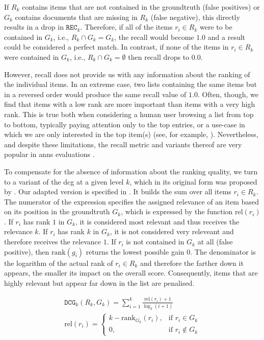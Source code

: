 If $R_k$ contains items that are not contained in the groundtruth (false positives) or $G_k$ contains documents that are missing in $R_k$ (false negative), this directly results in a drop in $\texttt{REC}_k$. Therefore, if all of the items $r_i \in R_k$ were to be contained in $G_k$, i.e., $R_k \cap G_k = G_k$, the recall would become $1.0$ and a result could be considered a perfect match. In contrast, if none of the items in $r_i \in R_k$ were contained in $G_k$, i.e., $R_k \cap G_k = \emptyset$ then recall drops to $0.0$. 

However, recall does not provide us with any information about the ranking of the individual items. In an extreme case, two lists containing the same items but in a reversed order would produce the same recall value of $1.0$. Often, though, we find that items with a low rank are more important than items with a very high rank. This is true both when considering a human user browsing a list from top to bottom, typically paying attention only to the top entries, or a use-case in which we are only interested in the top item(s) (see, for example, ). Nevertheless, and despite these limitations, the recall metric and variants thereof are very popular in \acrshort{anns} evaluations \cite{Aumueller:2017ANN,Simhadri:2022Results}. 

To compensate for the absence of information about the ranking quality, we turn to a variant of the \acrshort{dcg} at a given level $k$, which in its original form was proposed by \cite{Jarvelin:2002Cumulated}. Our adapted version is specified in . It builds the sum over all items $r_i \in R_k$. The numerator of the expression specifies the assigned relevance of an item based on its position in the groundtruth $G_k$, which is expressed by the function $\text{rel} (r_i)$. If $r_i$ has rank $1$ in $G_k$, it is considered most relevant and thus receives the relevance $k$. If $r_i$ has rank $k$ in $G_k$, it is not considered very releveant and therefore receives the relevance $1$. If $r_i$ is not contained in $G_k$ at all (false positive), then $\text{rank} (g_i)$ returns the lowest possible gain $0$. The denominator is the logarithm of the actual rank of $r_i \in R_k$ and therefore the farther down it appears, the smaller its impact on the overall score. Consequently, items that are highly relevant but appear far down in the list are penalised.

\begin{eqnarray}
\mathtt{DCG}_k (R_k, G_k)= \sum_{i = 1}^{k} \frac{\text{rel}(r_i) + 1}{\log_2(i + 1)} \\
\text{rel} (r_i) = 
    \begin{cases}
        k - \text{rank}_{G_k}(r_i), &  \text{if } r_i \in G_k \\
        0,                          &  \text{if } r_i \notin G_k
    \end{cases}
\label{equation:dcg}
\end{eqnarray}

